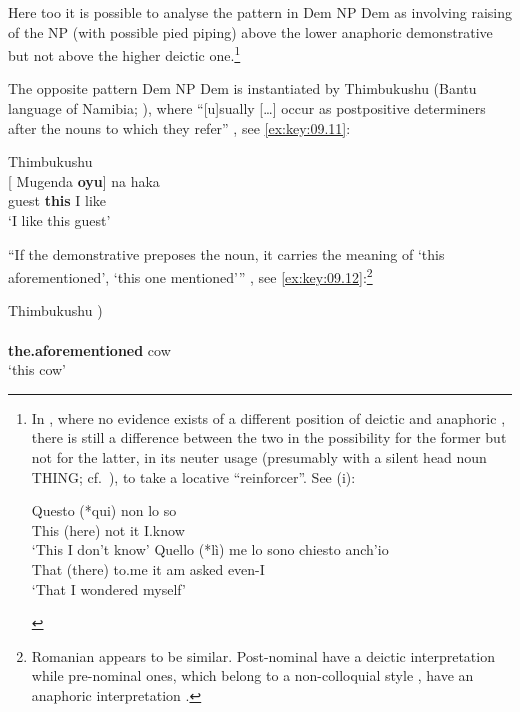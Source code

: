 \documentclass[output=paper]{langsci/langscibook}
\begin{document}
Here too it is possible to analyse the pattern in Dem NP
Dem as involving raising of the NP (with possible pied piping)
above the lower anaphoric demonstrative but not above the higher deictic
one.\footnote{In , where no evidence exists of a different 
    position of deictic and anaphoric , there is still a
    difference between the two in the possibility for the former but not for
    the latter, in its neuter usage (presumably with a silent head noun THING;
    cf.\ \citealt{KayPol2009}), to take a locative \enquote{reinforcer}. See
    (i):

\begin{exe}
\begin{xlist}
	\ex
		\gll Questo (*qui) non lo so\\
			 This (here) not it I.know\\
		\glt ‘This I don’t know’
	\ex
		\gll Quello (*lì) me lo sono chiesto anch’io\\
			That (there) to.me it am asked even-I\\
		\glt ‘That I wondered myself’
\end{xlist}
\end{exe}}

The opposite pattern Dem NP Dem is instantiated by
Thimbukushu (Bantu language of Namibia; \citealt{Fisch1998}), where
\enquote{[u]sually  [\dots{}] occur as postpositive determiners after
the nouns to which they refer} \parencite[50]{Fisch1998}, see \eqref{ex:key:09.11}:

\ea Thimbukushu\label{ex:key:09.11} \parencite[50]{Fisch1998}\\
	\gll {}[ Mugenda \textbf{oyu}] na haka\\
            {} guest \textbf{this} I like\\
	\glt ‘I like this guest’
\z

\enquote{If the demonstrative preposes the noun, it carries the meaning of
    \enquote*{this aforementioned}, \enquote*{this one mentioned}}
    \parencite[50]{Fisch1998}, see \eqref{ex:key:09.12}:\footnote{Romanian
        appears to be similar. Post-nominal  have a
    deictic interpretation while pre-nominal ones, which belong to a
non-colloquial style \parencite[cf.][n.\ 32]{Bruge2002}, have an anaphoric
interpretation \parencites[31]{Giusti2005}[299f]{Nicolae2013}.}

\ea Thimbukushu \parencite[50]{Fisch1998})\\\label{ex:key:09.12}
	\\
		    {} \textbf{the.aforementioned} cow\\
	\glt ‘this cow’
\z
\end{document}
